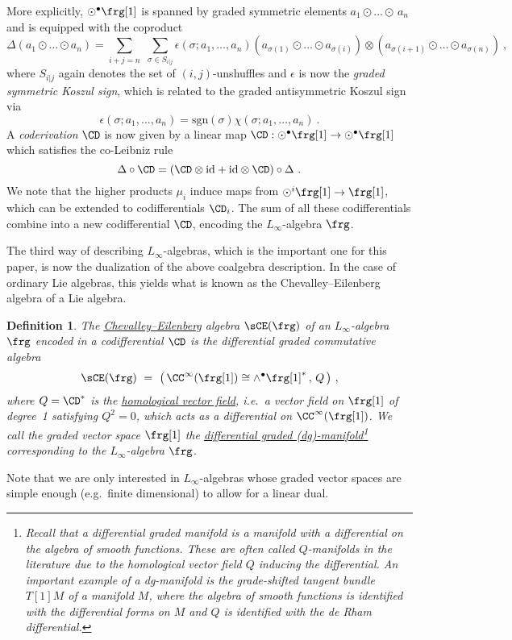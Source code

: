 \documentclass[reqno,a4paper,11pt]{article}
\let\fn\footnote
\renewcommand{\footnote}[1]{\linespread{1.1}\fn{#1}\linespread{1.29}}
\newtheorem{definition}[thm]{Definition}
\begin{document}
More explicitly, $\odot^\bullet \frg[1]$ is spanned by graded symmetric elements $a_1 \odot\dots\odot\, a_n$ and is equipped with the coproduct 
\begin{equation}
\Delta(a_1\odot\dots\odot a_n) = \sum\limits_{i+j=n}\,\,\sum\limits_{\sigma\in S_{i|j}} \epsilon(\sigma;a_1,\dots,a_n) (a_{\sigma(1)}\odot\dots\odot a_{\sigma(i)})\otimes(a_{\sigma(i+1)}\odot\dots\odot a_{\sigma(n)})~,
\end{equation}
where $S_{i|j}$ again denotes the set of $(i,j)$-unshuffles and $\epsilon$ is now the {\em graded symmetric Koszul sign}, which is related to the graded antisymmetric Koszul sign via
\begin{equation}
\epsilon(\sigma;a_1,\ldots,a_n) = \text{sgn}(\sigma)\chi(\sigma;a_1,\dots,a_n)~.
\end{equation}
A {\em coderivation} $\CD$ is now given by a linear map $\CD:\odot^\bullet \frg[1]\to\odot^\bullet\frg[1]$ which satisfies the co-Leibniz rule
\begin{equation}
\Delta\circ \CD = (\CD \otimes \text{id}+\text{id} \otimes \CD) \circ \Delta~.
\end{equation}
We note that the higher products $\mu_i$ induce maps from $\odot^i \frg[1]\rightarrow \frg[1]$, which can be extended to codifferentials $\CD_i$. The sum of all these codifferentials combine into a new codifferential $\CD$, encoding the $L_\infty$-algebra $\frg$.

The third way of describing $L_\infty$-algebras, which is the important one for this paper, is now the dualization of the above coalgebra description. In the case of ordinary Lie algebras, this yields what is known as the Chevalley--Eilenberg algebra of a Lie algebra.

\begin{definition}
 The \underline{Chevalley--Eilenberg} algebra $\sCE(\frg)$ of an $L_\infty$-algebra $\frg$ encoded in a codifferential $\CD$ is the differential graded commutative algebra
 \begin{equation}
  \sCE(\frg)~=~\big(\,\CC^\infty(\frg[1])\cong \wedge^\bullet \frg[1]^*\,,\,Q\,\big)~,
 \end{equation}
 where $Q=\CD^*$ is the \underline{homological vector field}, i.e.~a vector field on $\frg[1]$ of degree~1 satisfying $Q^2=0$, which acts as a differential on $\CC^\infty(\frg[1])$. We call the graded vector space $\frg[1]$ the \underline{differential graded (dg)-manifold}\footnote{Recall that a {\em differential graded manifold} is a manifold with a differential on the algebra of smooth functions. These are often called $Q$-manifolds in the literature due to the homological vector field $Q$ inducing the differential. An important example of a dg-manifold is the grade-shifted tangent bundle $T[1]M$ of a manifold $M$, where the algebra of smooth functions is identified with the differential forms on $M$ and $Q$ is identified with the de Rham differential.} corresponding to the $L_\infty$-algebra $\frg$.
\end{definition}
\noindent Note that we are only interested in $L_\infty$-algebras whose graded vector spaces are simple enough (e.g.~finite dimensional) to allow for a linear dual. 
\end{document}
